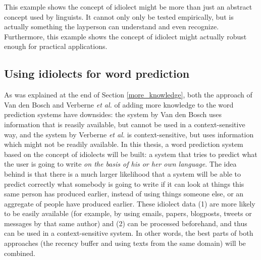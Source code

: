 \documentclass[11pt]{article}
\begin{document}
This example shows the concept of idiolect might be more than just an abstract concept used by linguists. It cannot only only be tested empirically, but is actually something the layperson can understand and even recognize. Furthermore, this example shows the concept of idiolect might actually robust enough for practical applications.

\subsection{Using idiolects for word prediction} \label{linking}
As was explained at the end of Section \ref{more_knowledge}, both the approach of Van den Bosch  and Verberne {\em et al.}  of adding more knowledge to the word prediction systems have downsides: the system by Van den Bosch  uses information that is reasily available, but cannot be used in a context-sensitive way, and the system by Verberne {\em et al.}  is context-sensitive, but uses information which might not be readily available. In this thesis, a word prediction system based on the concept of idiolects will be built: a system that tries to predict what the user is going to write \emph{on the basis of his  or her own language}. The idea behind is that there is a much larger likelihood that a system will be able to predict correctly what somebody is going to write if it can look at things this same person has produced earlier, instead of using things someone else, or an aggregate of people have produced earlier. These idiolect data (1) are more likely to be easily available (for example, by using emails, papers, blogposts, tweets or messages by that same author) and (2) can be processed beforehand, and thus can be used in a context-sensitive system. In other words, the best parts of both approaches (the recency buffer and using texts from the same domain) will be combined.
\end{document}
